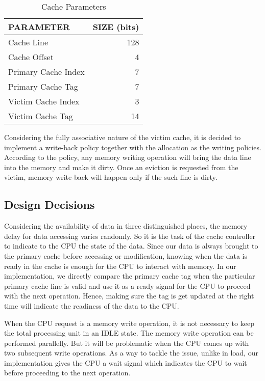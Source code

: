 \documentclass[12pt]{article}
\begin{document}
    \begin{table}[ht]
        \centering
        \begin{tabular}{|l|r|}
            \toprule
            PARAMETER           & SIZE (bits) \\
            \toprule\midrule
            Cache Line          & 128         \\\midrule
            Cache Offset        & 4           \\\midrule
            Primary Cache Index & 7           \\\midrule
            Primary Cache Tag   & 7           \\\midrule
            Victim Cache Index  & 3           \\\midrule
            Victim Cache Tag    & 14          \\\midrule
        \end{tabular}
        \caption{Cache Parameters}
        \label{table:cache_parameters}
    \end{table}
    \par
    Considering the fully associative nature of the victim cache, it is decided to implement a write-back policy together with the allocation as the writing policies.
    According to the policy, any memory writing operation will bring the data line into the memory and make it dirty.
    Once an eviction is requested from the victim, memory write-back will happen only if the such line is dirty.

    \subsection{Design Decisions}
    Considering the availability of data in three distinguished places, the memory delay for data accessing varies randomly.
    So it is the task of the cache controller to indicate to the CPU the state of the data.
    Since our data is always brought to the primary cache before accessing or modification, knowing when the data is ready in the cache is enough for the CPU to interact with memory.
    In our implementation, we directly compare the primary cache tag when the particular primary cache line is valid and use it as a ready signal for the CPU to proceed with the next operation.
    Hence, making sure the tag is get updated at the right time will indicate the readiness of the data to the CPU.
    \par
    When the CPU request is a memory write operation, it is not necessary to keep the total processing unit in an IDLE state.
    The memory write operation can be performed parallelly. But it will be problematic when the CPU comes up with two subsequent write operations.
    As a way to tackle the issue, unlike in load, our implementation gives the CPU a wait signal which indicates the CPU to wait before proceeding to the next operation.
\end{document}
